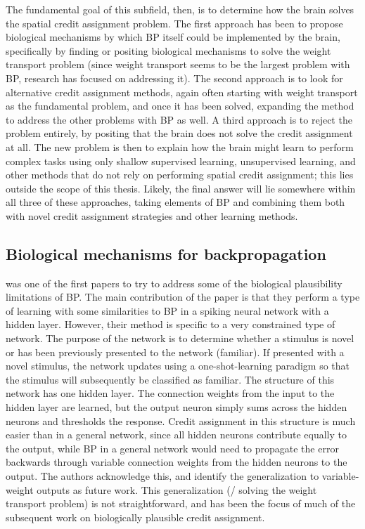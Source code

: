 The fundamental goal of this subfield, then,
is to determine how the brain solves the spatial credit assignment problem.
The first approach has been to propose biological mechanisms
by which BP itself could be implemented by the brain,
specifically by finding or positing biological mechanisms
to solve the weight transport problem
(since weight transport seems to be the largest problem with BP,
research has focused on addressing it).
The second approach is to look for alternative credit assignment methods,
again often starting with weight transport as the fundamental problem,
and once it has been solved,
expanding the method to address the other problems with BP as well.
A third approach is to reject the problem entirely,
by positing that the brain does not solve the credit assignment at all.
The new problem is then to explain how the brain might learn
to perform complex tasks
using only shallow supervised learning, unsupervised learning,
and other methods that do not rely on performing spatial credit assignment;
this lies outside the scope of this thesis.
Likely, the final answer will lie somewhere within all three of these approaches,
taking elements of BP and combining them both with
novel credit assignment strategies and other learning methods.


\subsection{Biological mechanisms for backpropagation}

\textcite{Bogacz2000} was one of the first papers to try to address
some of the biological plausibility limitations of BP.
The main contribution of the paper is that they perform a type of learning
with some similarities to BP
in a spiking neural network with a hidden layer.
However, their method is specific to a very constrained type of network.
The purpose of the network is to determine whether a stimulus is novel
or has been previously presented to the network (familiar).
If presented with a novel stimulus, the network updates
using a one-shot-learning paradigm so that the stimulus
will subsequently be classified as familiar.
The structure of this network has one hidden layer.
The connection weights from the input to the hidden layer are learned,
but the output neuron simply sums across the hidden neurons
and thresholds the response.
Credit assignment in this structure is much easier than in a general network,
since all hidden neurons contribute equally to the output,
while BP in a general network would need
to propagate the error backwards through variable connection weights
from the hidden neurons to the output.
The authors acknowledge this,
and identify the generalization to variable-weight outputs as future work.
This generalization (\ie/ solving the weight transport problem) is not straightforward,
and has been the focus of much of the subsequent work on
biologically plausible credit assignment.


